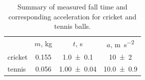 \begin{table}
  \caption{Summary of measured fall time and corresponding acceleration for cricket and tennis balls.}
  \label{tab:1}
  \begin{ruledtabular}
    \begin{tabular}{lccc}
      & $m$, \unit{\kilo\gram} & $t$, \unit{\second} & $a$, \unit{\meter\per\second\squared} \\
      \colrule
      cricket & \num{0.155} & \num{1.0\pm0.1} & \num{10\pm2} \\
      tennis &  \num{0.056} & \num{1.00\pm0.04} & \num{10.0\pm0.9} 
    \end{tabular}
  \end{ruledtabular}
\end{table}
